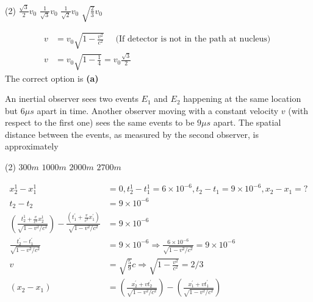 \begin{enumerate}
\begin{minipage}{\textwidth}
\end{minipage}
\begin{tasks}(2)
	\task[\textbf{A.}] $\frac{\sqrt{3}}{2} v_{0}$
	\task[\textbf{B.}]$\frac{1}{\sqrt{3}} v_{0}$
	\task[\textbf{C.}]$\frac{1}{\sqrt{2}} v_{0}$
	\task[\textbf{D.}]$\sqrt{\frac{2}{3}} v_{0}$
\end{tasks}
\begin{answer}
	\begin{align*}
	v&=v_{0} \sqrt{1-\frac{v^{2}}{c^{2}}} \quad \text { (If detector is not in the path at nucleus) }\\
	v&=v_{0} \sqrt{1-\frac{1}{4}}=v_{0} \frac{\sqrt{3}}{2}
	\end{align*}
	The correct option is \textbf{(a)}
\end{answer}
\begin{minipage}{\textwidth}
	\item An inertial observer sees two events $E_{1}$ and $E_{2}$ happening at the same location but $6 \mu s$ apart in time. Another observer moving with a constant velocity $v$ (with respect to the first one) sees the same events to be $9 \mu s$ apart. The spatial distance between the events, as measured by the second observer, is approximately
\end{minipage}
\begin{tasks}(2)
	\task[\textbf{A.}] $300 m$
	\task[\textbf{B.}]$1000 m$
	\task[\textbf{C.}]$2000 m$
	\task[\textbf{D.}]$2700 m$
\end{tasks}
\begin{answer}
\begin{align*}
	x_{2}^{1}-x_{1}^{1}&=0, t_{2}^{1}-t_{1}^{1}=6 \times 10^{-6}, t_{2}-t_{1}=9 \times 10^{-6}, x_{2}-x_{1}=?\\
t_{2}-t_{2}&=9 \times 10^{-6}\\
\left(\frac{t_{2}^{1}+\frac{v}{c^{2}} x_{2}^{1}}{\sqrt{1-v^{2} / c^{2}}}\right)-\frac{\left(t_{1}^{\prime}+\frac{v}{c^{2}} x_{1}^{\prime}\right)}{\sqrt{1-v^{2} / c^{2}}}&=9 \times 10^{-6}\\
\frac{t_{2}^{\prime}-t_{1}^{\prime}}{\sqrt{1-v^{2} / c^{2}}}&=9 \times 10^{-6} \Rightarrow \frac{6 \times 10^{-6}}{\sqrt{1-v^{2} / c^{2}}}=9 \times 10^{-6}\\
v&=\sqrt{\frac{5}{9}} c \Rightarrow \sqrt{1-\frac{v^{2}}{c^{2}}}=2 / 3\\
\left(x_{2}-x_{1}\right)&=\left(\frac{x_{2}^{\prime}+v t_{2}^{\prime}}{\sqrt{1-v^{2} / c^{2}}}\right)-\left(\frac{x_{1}^{\prime}+v t_{1}^{\prime}}{\sqrt{1-v^{2} / c^{2}}}\right)\\

\end{align*}
\end{answer}
\end{enumerate}

